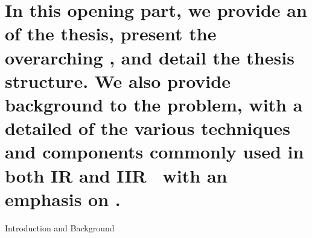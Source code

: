 
\newcommand{\partheaderimage}{figures/p1-header}
\part[Introduction and Background]{In this opening part, we provide an  of the thesis, present the overarching , and detail the thesis structure. We also provide background to the problem, with a detailed  of the various techniques and components commonly used in both IR and IIR \textemdash~with an emphasis on .}{Introduction and Background}
\label{part:intro}